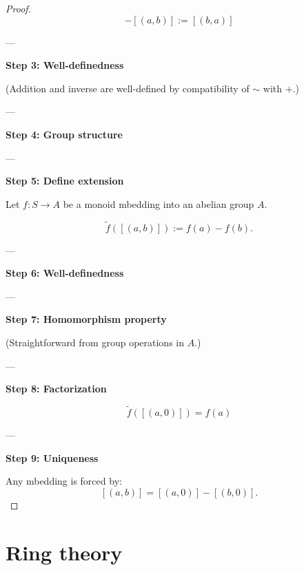 \documentclass[10pt,a4paper]{book}
\begin{document}
\begin{proof}
    \[
        -[(a,b)] := [(b,a)]
    \]

    ---

    \textbf{Step 3: Well-definedness}

    (Addition and inverse are well-defined by compatibility of $\sim$ with $+$.)

    ---

    \textbf{Step 4: Group structure}

    \begin{fitchproof}[arrayenv=tabular]


    \end{fitchproof}

    ---

    \textbf{Step 5: Define extension}

    Let $f:S\to A$ be a monoid mbedding into an abelian group $A$.

    \[
        \tilde{f}([(a,b)]) := f(a) - f(b).
    \]

    ---

    \textbf{Step 6: Well-definedness}

    \begin{fitchproof}[arrayenv=tabular]


    \end{fitchproof}

    ---

    \textbf{Step 7: Homomorphism property}

    (Straightforward from group operations in $A$.)

    ---

    \textbf{Step 8: Factorization}

    \[
        \tilde{f}([(a,0)]) = f(a)
    \]

    ---

    \textbf{Step 9: Uniqueness}

    Any mbedding is forced by:
    \[
        [(a,b)] = [(a,0)] - [(b,0)].
    \]

\end{proof}

\section{Ring theory}
\end{document}
